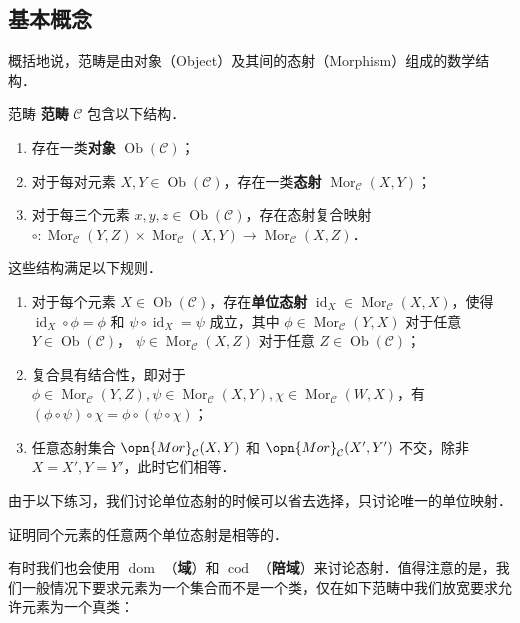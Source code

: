 
\begin{issues}
\issueMissDepend
\issueNeedCite
\issueAbstract
\end{issues}

\subsection{基本概念}
概括地说，范畴是由对象（Object）及其间的态射（Morphism）组成的数学结构．
\begin{definition}{范畴}
\textbf{范畴} $\mathcal{C}$ 包含以下结构．
\begin{enumerate}
    \item 存在一类\textbf{对象} $\operatorname{Ob}(\mathcal{C})$；
    \item 对于每对元素 $X,Y\in\operatorname{Ob}(\mathcal{C})$，存在一类\textbf{态射} $\operatorname{Mor}_\mathcal{C}(X,Y)$；
    \item 对于每三个元素 $x,y,z\in\operatorname{Ob}(\mathcal{C})$，存在态射复合映射 ${\circ}:\operatorname{Mor}_\mathcal{C}(Y,Z)\times\operatorname{Mor}_{\mathcal{C}}(X,Y)\to\operatorname{Mor}_\mathcal{C}(X,Z)$．
\end{enumerate}
这些结构满足以下规则．
\begin{enumerate}
    \item 对于每个元素 $X\in\operatorname{Ob}(\mathcal{C})$，存在\textbf{单位态射} $\operatorname{id}_X\in\operatorname{Mor}_\mathcal{C}(X,X)$，使得 $\operatorname{id}_X\circ\phi=\phi$ 和 $\psi\circ\operatorname{id}_X=\psi$ 成立，其中 $\phi\in\operatorname{Mor}_\mathcal{C}(Y,X)$ 对于任意 $Y\in\operatorname{Ob}(\mathcal{C})$， $\psi\in\operatorname{Mor}_\mathcal{C}(X,Z)$ 对于任意 $Z\in\operatorname{Ob}(\mathcal{C})$；
    \item 复合具有结合性，即对于 $\phi\in\operatorname{Mor}_\mathcal{C}(Y,Z),\psi\in\operatorname{Mor}_\mathcal{C}(X,Y),\chi\in\operatorname{Mor}_\mathcal{C}(W,X)$，有 $(\phi\circ\psi)\circ\chi=\phi\circ(\psi\circ\chi)$；
    \item 任意态射集合 $\opn{Mor}_\mathcal{C}(X,Y)$ 和 $\opn{Mor}_\mathcal{C}(X',Y')$ 不交，除非 $X=X',Y=Y'$，此时它们相等．
\end{enumerate}
\end{definition}
由于以下练习，我们讨论单位态射的时候可以省去选择，只讨论唯一的单位映射．
\begin{exercise}{}
证明同个元素的任意两个单位态射是相等的．
\end{exercise}
有时我们也会使用 $\operatorname{dom}$ （\textbf{域}）和 $\operatorname{cod}$ （\textbf{陪域}）来讨论态射．值得注意的是，我们一般情况下要求元素为一个集合而不是一个类，仅在如下范畴中我们放宽要求允许元素为一个真类：
